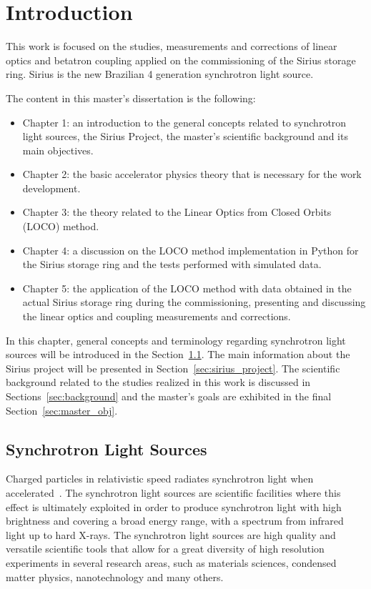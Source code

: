 \chapter{Introduction} \label{chap:intro}
This work is focused on the studies, measurements and corrections of linear optics and betatron coupling applied on the commissioning of the Sirius storage ring. Sirius is the new Brazilian 4 generation synchrotron light source. 

The content in this master's dissertation is the following:
\begin{itemize}
    \item Chapter 1: an introduction to the general concepts related to synchrotron light sources, the Sirius Project, the master's scientific background and its main objectives.
    \item Chapter 2: the basic accelerator physics theory that is necessary for the work development.
    \item Chapter 3: the theory related to the Linear Optics from Closed Orbits (LOCO) method.
    \item Chapter 4: a discussion on the LOCO method implementation in Python for the Sirius storage ring and the tests performed with simulated data.
    \item Chapter 5: the application of the LOCO method with data obtained in the actual Sirius storage ring during the commissioning, presenting and discussing the linear optics and coupling measurements and corrections.
\end{itemize}

In this chapter, general concepts and terminology regarding synchrotron light sources will be introduced in the Section~\ref{sec:sls}. The main information about the Sirius project will be presented in Section~\ref{sec:sirius_project}. The scientific background related to the studies realized in this work is discussed in Sections~\ref{sec:background} and the master's goals are exhibited in the final Section~\ref{sec:master_obj}.
\section{Synchrotron Light Sources}\label{sec:sls}
Charged particles in relativistic speed radiates synchrotron light when accelerated~\cite{jackson}. The synchrotron light sources are scientific facilities where this effect is ultimately exploited in order to produce synchrotron light with high brightness and covering a broad energy range, with a spectrum from infrared light up to hard X-rays. The synchrotron light sources are high quality and versatile scientific tools that allow for a great diversity of high resolution experiments in several research areas, such as materials sciences, condensed matter physics, nanotechnology and many others.

